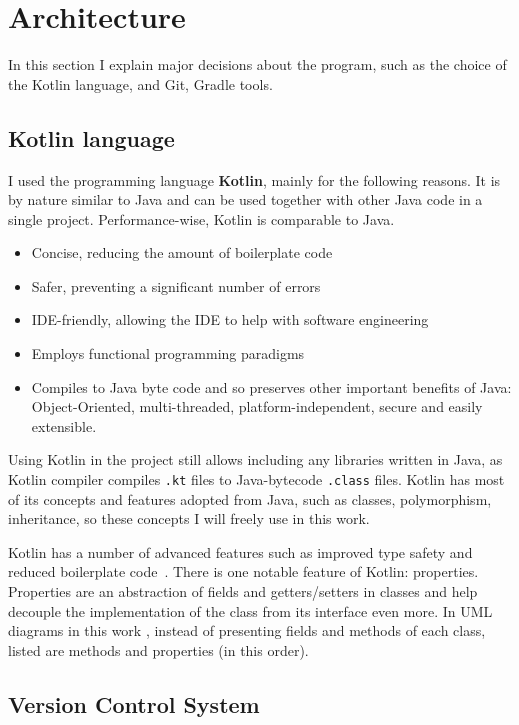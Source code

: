 \section{Architecture}

In this section I explain major decisions about the program, such as the choice of the Kotlin language, and Git, Gradle tools.

\subsection{Kotlin language}

I used the programming language \textbf{Kotlin}, mainly for the following reasons.
It is by nature similar to Java and can be used together with other Java code in a single project.
Performance-wise, Kotlin is comparable to Java.
\begin{itemize}
    \item Concise, reducing the amount of boilerplate code
    \item Safer, preventing a significant number of errors
    \item IDE-friendly, allowing the IDE to help with software engineering
    \item Employs functional programming paradigms~\cite{Bonev}
    \item Compiles to Java byte code and so preserves other important benefits of Java: Object-Oriented, multi-threaded, platform-independent, secure and easily extensible.
\end{itemize}

Using Kotlin in the project still allows including any libraries written in Java, as Kotlin compiler compiles \texttt{.kt} files to Java-bytecode \texttt{.class} files.
Kotlin has most of its concepts and features adopted from Java, such as classes, polymorphism, inheritance, so these concepts I will freely use in this work.

Kotlin has a number of advanced features such as improved type safety and reduced boilerplate code~\cite{JemerovKotlinAction2017}.
There is one notable feature of Kotlin: properties.
Properties are an abstraction of fields and getters/setters in classes and help decouple the implementation of the class from its interface even more.
In UML diagrams in this work , instead of presenting fields and methods of each class, listed are methods and properties (in this order).

\subsection{Version Control System}

